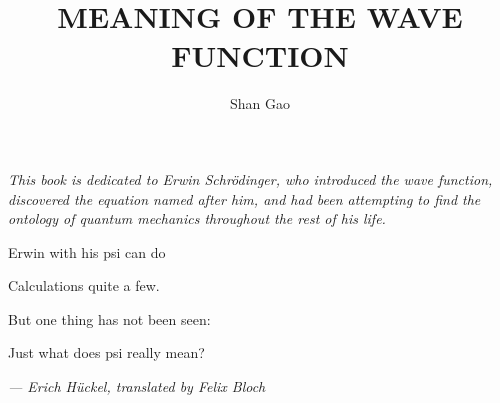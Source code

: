 \documentclass{cambridge6A}%
\begin{document}
  \title[In search of the ontology of quantum mechanics]
    {MEANING OF THE WAVE FUNCTION}

  \author{Shan Gao\\[3\baselineskip]}

  \frontmatter
  \maketitle

\newpage
 \vspace*{10cm}

\textit{\large This book is dedicated to Erwin Schr\"{o}dinger, who introduced the wave function, discovered the equation named after him, and had been attempting to find the ontology of quantum mechanics throughout the rest of his life.}\\ 

\setcounter{tocdepth}{2}
  \tableofcontents

\newpage
\thispagestyle{empty}
 \vspace*{10cm}

\hfill{Erwin with his psi can do}

\hfill{Calculations quite a few.}

\hfill{But one thing has not been seen:}

\hfill{Just what does psi really mean?}

\hfill\textit{--- Erich H\"uckel, translated by Felix Bloch}

  \listoffigures
%  
%   

  \mainmatter


  

%  
\end{document}
